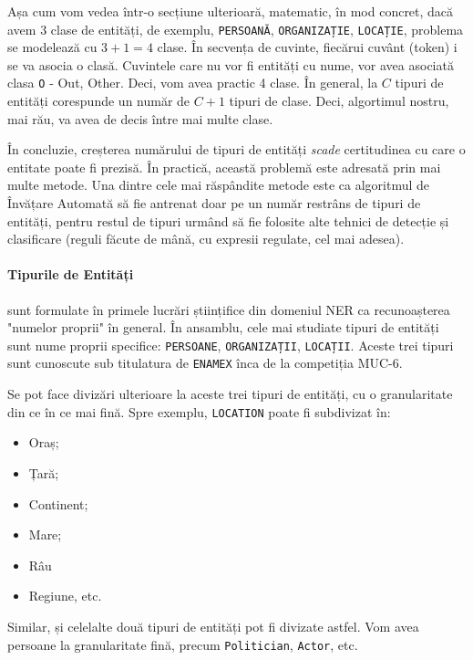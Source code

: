 Așa cum vom vedea într-o secțiune ulterioară, matematic, în mod concret, dacă avem 3 clase de entități, de exemplu, \texttt{PERSOANĂ}, \texttt{ORGANIZAȚIE}, \texttt{LOCAȚIE}, problema se modelează cu $3 + 1  = 4$ clase. În secvența de cuvinte, fiecărui cuvânt (token) i se va asocia o clasă. Cuvintele care nu vor fi entități cu nume, vor avea asociată clasa \texttt{O} - Out, Other. Deci, vom avea practic 4 clase. În general, la $C$ tipuri de entități corespunde un număr de $C + 1$ tipuri de clase. Deci, algortimul nostru, mai rău, va avea de decis între mai multe clase. 

În concluzie, creșterea numărului de tipuri de entități \textit{scade} certitudinea cu care o entitate poate fi prezisă. În practică, această problemă este adresată prin mai multe metode. Una dintre cele mai răspândite metode este ca algoritmul de Învățare Automată să fie antrenat doar pe un număr restrâns de tipuri de entități, pentru restul de tipuri urmând să fie folosite alte tehnici de detecție și clasificare (reguli făcute de mână, cu expresii regulate, cel mai adesea).

\paragraph{Tipurile de Entități} sunt formulate în primele lucrări științifice din domeniul NER ca recunoașterea "numelor proprii" în general. În ansamblu, cele mai  studiate tipuri de entități sunt nume proprii specifice: \texttt{PERSOANE}, \texttt{ORGANIZAȚII}, \texttt{LOCAȚII}. Aceste trei tipuri sunt cunoscute sub titulatura de \texttt{ENAMEX} înca de la competiția MUC-6\cite{grishman1996}.

Se pot face divizări ulterioare la aceste trei tipuri de entități, cu o granularitate din ce în ce mai fină. Spre exemplu, \texttt{LOCATION} poate fi subdivizat în:

\begin{itemize}
\item Oraș;
\item Țară;
\item Continent;
\item Mare;
\item Râu
\item Regiune, etc.
\end{itemize}

Similar, și celelalte două tipuri de entități pot fi divizate astfel. Vom avea persoane la granularitate fină, precum \texttt{Politician}, \texttt{Actor}, etc.

